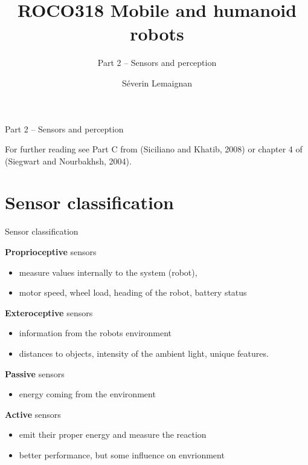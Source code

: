 \documentclass[compress]{beamer}
\title{ROCO318 \newline Mobile and humanoid robots}
\subtitle{Part 2 -- Sensors and perception}
\date{}
\author{Séverin Lemaignan}
\institute{Centre for Neural Systems and Robotics\\{\bf Plymouth University}}
\providecommand{\tightlist}{%
  \setlength{\itemsep}{0pt}\setlength{\parskip}{0pt}}
\begin{document}

\maketitle

\begin{frame}{Part 2 -- Sensors and perception}

For further reading see Part C from (Siciliano and Khatib, 2008) or
chapter 4 of (Siegwart and Nourbakhsh, 2004).

\end{frame}

\section{Sensor classification}\label{sensor-classification}

\begin{frame}{Sensor classification}

\textbf{Proprioceptive} sensors

\begin{itemize}
\tightlist
\item
  measure values internally to the system (robot),
\item
  \eg motor speed, wheel load, heading of the robot, battery status
\end{itemize}

\textbf{Exteroceptive} sensors

\begin{itemize}
\tightlist
\item
  information from the robots environment
\item
  distances to objects, intensity of the ambient light, unique features.
\end{itemize}

\textbf{Passive} sensors

\begin{itemize}
\tightlist
\item
  energy coming from the environment
\end{itemize}

\textbf{Active} sensors

\begin{itemize}
\tightlist
\item
  emit their proper energy and measure the reaction
\item
  better performance, but some influence on envrionment
\end{itemize}

\end{frame}
\end{document}

